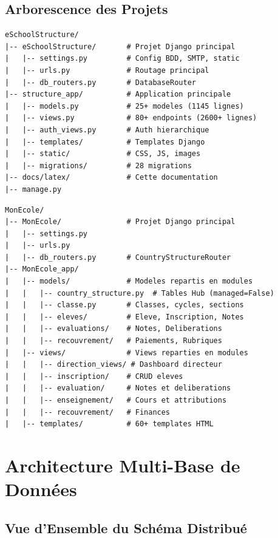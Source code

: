 \documentclass[12pt,a4paper,oneside]{report}
\begin{document}
\section{Arborescence des Projets}

\begin{lstlisting}[style=python, title=eSchoolStructure]
eSchoolStructure/
|-- eSchoolStructure/       # Projet Django principal
|   |-- settings.py         # Config BDD, SMTP, static
|   |-- urls.py             # Routage principal
|   |-- db_routers.py       # DatabaseRouter
|-- structure_app/          # Application principale
|   |-- models.py           # 25+ modeles (1145 lignes)
|   |-- views.py            # 80+ endpoints (2600+ lignes)
|   |-- auth_views.py       # Auth hierarchique
|   |-- templates/          # Templates Django
|   |-- static/             # CSS, JS, images
|   |-- migrations/         # 28 migrations
|-- docs/latex/             # Cette documentation
|-- manage.py
\end{lstlisting}

\begin{lstlisting}[style=python, title=MonEcole]
MonEcole/
|-- MonEcole/               # Projet Django principal
|   |-- settings.py
|   |-- urls.py
|   |-- db_routers.py       # CountryStructureRouter
|-- MonEcole_app/
|   |-- models/             # Modeles repartis en modules
|   |   |-- country_structure.py  # Tables Hub (managed=False)
|   |   |-- classe.py       # Classes, cycles, sections
|   |   |-- eleves/         # Eleve, Inscription, Notes
|   |   |-- evaluations/    # Notes, Deliberations
|   |   |-- recouvrement/   # Paiements, Rubriques
|   |-- views/              # Views reparties en modules
|   |   |-- direction_views/ # Dashboard directeur
|   |   |-- inscription/    # CRUD eleves
|   |   |-- evaluation/     # Notes et deliberations
|   |   |-- enseignement/   # Cours et attributions
|   |   |-- recouvrement/   # Finances
|   |-- templates/          # 60+ templates HTML
\end{lstlisting}


\chapter{Architecture Multi-Base de Données}

\section{Vue d'Ensemble du Schéma Distribué}
\end{document}
